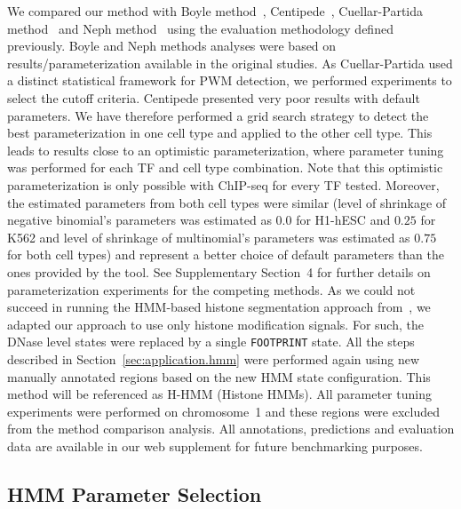 \documentclass{bioinfo}
\begin{document}
\begin{methods}
We compared our method with Boyle method~\citep{boyle2011}, Centipede~\citep{pique2011},
Cuellar-Partida method~\citep{cuellar2012} and Neph method~\citep{neph2012a} using the
evaluation methodology defined previously. Boyle and Neph methods analyses were based on
results/parameterization available in the original studies. As Cuellar-Partida used a
distinct statistical framework for PWM detection, we performed experiments to select the
cutoff criteria. Centipede presented very poor results with default parameters. We have
therefore performed a grid search strategy to detect the best parameterization in one cell
type and applied to the other cell type. This leads to results close to an optimistic
parameterization, where parameter tuning was performed for each TF and cell type combination.
Note that this optimistic parameterization is only possible with ChIP-seq for every TF
tested. Moreover, the estimated parameters from both cell types were similar (level of shrinkage
of negative binomial's parameters was estimated as $0.0$ for H1-hESC and $0.25$ for K562
and level of shrinkage of multinomial's parameters was estimated as $0.75$ for both cell
types) and represent a better choice of default parameters than the ones provided by the
tool. See Supplementary Section~4 for further details on parameterization experiments for
the competing methods. As we could not succeed in running the HMM-based histone segmentation
approach from~\cite{won2010}, we adapted our approach to use only histone modification
signals. For such, the DNase level states were replaced by a
single {\tt FOOTPRINT} state. All the steps described in Section~\ref{sec:application.hmm}
were performed again using new manually annotated regions based on the new HMM state
configuration. This method will be referenced as H-HMM (Histone HMMs). All parameter tuning
experiments were performed on chromosome~1 and these regions were excluded from the method
comparison analysis. All annotations, predictions and evaluation data are available in our
web supplement for future benchmarking purposes.

\subsection{HMM Parameter Selection}


\end{methods}
\end{document}

